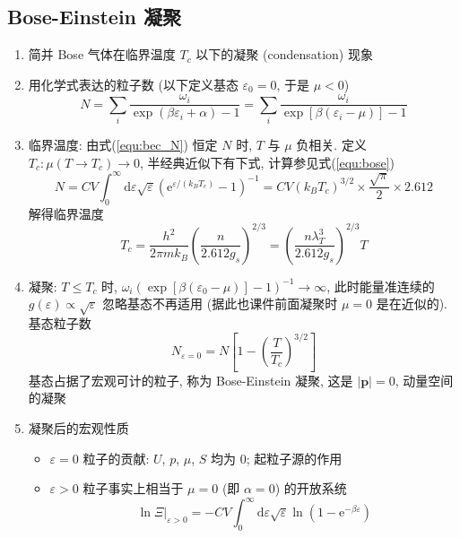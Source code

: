 \documentclass[12pt,a4paper]{article}%
\numberwithin{equation}{section}
\renewcommand*{\vec}[1]{\bm{#1}}%
\newcommand{\dif}{\mathrm{d}}
\newcommand\e{\mathrm{e}}%
\begin{document}
\subsection{Bose-Einstein 凝聚} %
\label{sub:BEC}
\begin{enumerate}
    \item 简并 Bose 气体在临界温度 $T_c$ 以下的凝聚 (condensation) 现象
    \item 用化学式表达的粒子数 (以下定义基态 $\varepsilon_0 = 0$, 于是 $\mu<0$)
    \begin{equation}\label{equ:bec_N}
        N = \sum_i\frac{\omega_i}{\exp(\beta\varepsilon_i + \alpha) - 1} 
         = \sum_i\frac{\omega_i}{\exp[\beta(\varepsilon_i - \mu)] - 1}
    \end{equation}
    \item 临界温度: 由式(\ref{equ:bec_N}) 恒定 $N$ 时, $T$ 与 $\mu$ 负相关. 
    定义 $T_c : \mu(T \to T_c) \to 0$, 半经典近似下有下式, 计算参见式(\ref{equ:bose})
    \begin{equation}
        N = CV\int_0^\infty\dif\varepsilon\sqrt\varepsilon\left(\e^{\varepsilon/(k_B T_c)} - 1\right)^{-1}
        =CV(k_B T_c)^{3/2}\times\frac{\sqrt\pi}2\times2.612
    \end{equation}
    解得临界温度
    \begin{equation}\label{equ:tc_for_bec}
        T_c = \frac{h^2}{2\pi mk_B}\left(\frac{n}{2.612g_s}\right)^{2/3} = \left(\frac{n\lambda_T^3}{2.612g_s}\right)^{2/3}T
    \end{equation}
    \item 凝聚: $T\le T_c$ 时, $\omega_i(\exp[\beta(\varepsilon_0-\mu)]-1)^{-1}\to\infty$, 
    此时能量准连续的 $g(\varepsilon)\propto\sqrt\varepsilon$ 忽略基态不再适用 
    (据此也课件前面凝聚时 $\mu = 0$ 是在近似的). 
    基态粒子数
    \begin{equation}
        N_{\varepsilon = 0} = N\left[1-\left(\frac T{T_c}\right)^{3/2}\right]
    \end{equation}
    基态占据了宏观可计的粒子, 称为 Bose-Einstein 凝聚, 
    这是 $|\vec p| = 0$, 动量空间的凝聚
    \item 凝聚后的宏观性质
    \begin{itemize}
        \item $\varepsilon = 0$ 粒子的贡献: $U$, $p$, $\mu$, $S$ 均为 $0$; 
        起粒子源的作用
        \item $\varepsilon > 0$ 粒子事实上相当于 $\mu=0$ (即 $\alpha = 0$) 的开放系统
        \begin{equation}
            \ln\Xi|_{\varepsilon>0} = -CV\int_0^\infty\dif\varepsilon\sqrt\varepsilon\ln\left(1-\e^{-\beta\varepsilon}\right)

\end{equation}
\end{itemize}
\end{enumerate}
\end{document}
